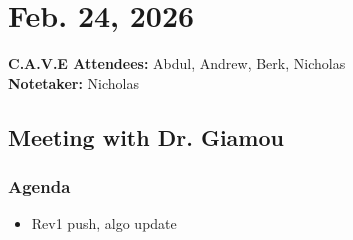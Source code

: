 	\pagebreak
	\section*{Feb. 24, 2026}

	\textbf{C.A.V.E Attendees:} Abdul, Andrew, Berk, Nicholas\\
	\textbf{Notetaker:} Nicholas

	\subsection*{Meeting with Dr. Giamou}
		\subsubsection*{Agenda}
			\begin{itemize}
				\item Rev1 push, algo update
			\end{itemize}

